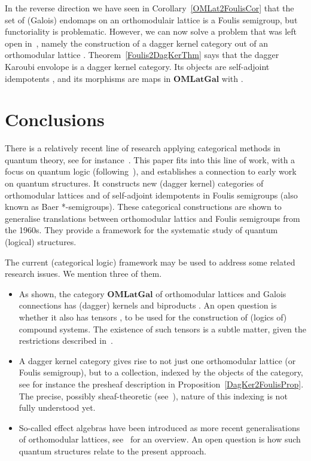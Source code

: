 \documentclass{article}
\newcommand{\Cat}[1]{\ensuremath{\mathbf{#1}}}
\begin{document}
In the reverse direction we have seen in
Corollary~\ref{OMLat2FoulisCor} that the set  of (Galois)
endomaps on an orthomodulair lattice  is a Foulis semigroup, but
functoriality is problematic. However, we can now solve a problem that
was left open in~\cite{HeunenJ09a}, namely the construction of a
dagger kernel category out of an orthomodular lattice
. Theorem~\ref{Foulis2DagKerThm} says that the dagger Karoubi
envolope  is a dagger kernel category. Its
objects are self-adjoint idempotents , and its
morphisms  are maps  in \Cat{OMLatGal} with .



\section{Conclusions}\label{ConclusionSec}

There is a relatively recent line of research applying categorical
methods in quantum theory, see for
instance~\cite{ButterfieldI98,AbramskyC04,Selinger07,DoeringI08,HeunenLS09,CoeckePV09}. This
paper fits into this line of work, with a focus on quantum logic
(following~\cite{HeunenJ09a}), and establishes a connection to early
work on quantum structures. It constructs new (dagger kernel)
categories of orthomodular lattices and of self-adjoint idempotents in
Foulis semigroups (also known as Baer *-semigroups). These categorical
constructions are shown to generalise translations between
orthomodular lattics and Foulis semigroups from the 1960s.  They
provide a framework for the systematic study of quantum (logical)
structures.

The current (categorical logic) framework may be used to address some
related research issues. We mention three of them.
\begin{itemize}
\item As shown, the category \Cat{OMLatGal} of orthomodular lattices
  and Galois connections has (dagger) kernels and biproducts
  . An open question is whether it also has tensors ,
  to be used for the construction of (logics of) compound systems. The
  existence of such tensors is a subtle matter, given the restrictions
  described in~\cite{RandallF79}.

\item A dagger kernel category gives rise to not just one orthomodular
  lattice (or Foulis semigroup), but to a collection, indexed by the
  objects of the category, see for instance the presheaf description
  in Proposition~\ref{DagKer2FoulisProp}. The precise, possibly
  sheaf-theoretic (see~\cite{GravesS73}), nature of this indexing is
  not fully understood yet.

\item So-called effect algebras have been introduced as more recent
  generalisations of orthomodular lattices, see~\cite{DvurecenskijP00}
  for an overview. An open question is how such quantum structures
  relate to the present approach.
\end{itemize}
\end{document}
